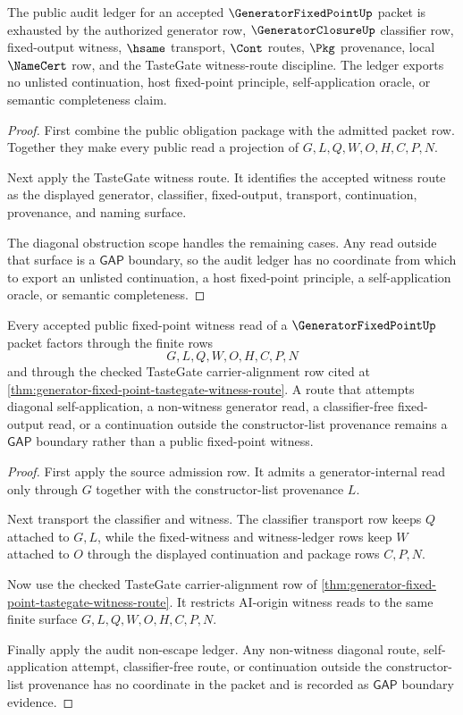 \begin{theorem}
\label{thm:generator-fixed-point-audit-nonescape-ledger}
The public audit ledger for an accepted $\GeneratorFixedPointUp$ packet is exhausted by the authorized generator row, $\GeneratorClosureUp$ classifier row, fixed-output witness, $\hsame$ transport, $\Cont$ routes, $\Pkg$ provenance, local $\NameCert$ row, and the TasteGate witness-route discipline. The ledger exports no unlisted continuation, host fixed-point principle, self-application oracle, or semantic completeness claim.
\end{theorem}
\begin{proof}
First combine the public obligation package with the admitted packet row. Together they make every public read a projection of $G,L,Q,W,O,H,C,P,N$.

Next apply the TasteGate witness route. It identifies the accepted witness route as the displayed generator, classifier, fixed-output, transport, continuation, provenance, and naming surface.

The diagonal obstruction scope handles the remaining cases. Any read outside that surface is a $\mathsf{GAP}$ boundary, so the audit ledger has no coordinate from which to export an unlisted continuation, a host fixed-point principle, a self-application oracle, or semantic completeness.
\end{proof}

\begin{theorem}
\label{thm:generator-fixed-point-tastegate-boundary-exhaustion}
Every accepted public fixed-point witness read of a $\GeneratorFixedPointUp$ packet factors through the finite rows
$$
G,L,Q,W,O,H,C,P,N
$$
and through the checked TasteGate carrier-alignment row cited at \autoref{thm:generator-fixed-point-tastegate-witness-route}. A route that attempts diagonal self-application, a non-witness generator read, a classifier-free fixed-output read, or a continuation outside the constructor-list provenance remains a $\mathsf{GAP}$ boundary rather than a public fixed-point witness.
\end{theorem}
\begin{proof}
First apply the source admission row. It admits a generator-internal read only through $G$ together with the constructor-list provenance $L$.

Next transport the classifier and witness. The classifier transport row keeps $Q$ attached to $G,L$, while the fixed-witness and witness-ledger rows keep $W$ attached to $O$ through the displayed continuation and package rows $C,P,N$.

Now use the checked TasteGate carrier-alignment row of \autoref{thm:generator-fixed-point-tastegate-witness-route}. It restricts AI-origin witness reads to the same finite surface $G,L,Q,W,O,H,C,P,N$.

Finally apply the audit non-escape ledger. Any non-witness diagonal route, self-application attempt, classifier-free route, or continuation outside the constructor-list provenance has no coordinate in the packet and is recorded as $\mathsf{GAP}$ boundary evidence.
\end{proof}


